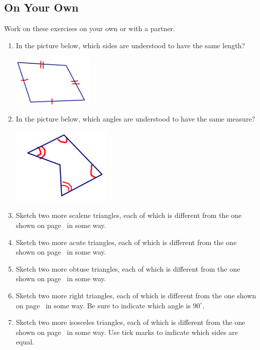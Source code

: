 \subsection*{On Your Own}
Work on these exercises on your own or with a partner.  
\begin{enumerate}
\item
In the picture below, which sides are understood to have the same length?
\begin{center}
\includegraphics[height=2.5cm]{whatseq}  
\end{center}

\item
In the picture below, which angles are understood to have the same measure?
\begin{center}
\includegraphics[height=3.7cm]{whatseq2}  
\end{center}


\item
Sketch two more scalene triangles, each of which is different from the one shown on page~\pageref{def:trisides} in some way.  \\
\item
Sketch two more acute triangles, each of which is different from the one shown on page~\pageref{def:triangs} in some way.\\
\item
Sketch two more obtuse triangles, each of which is different from the one shown on page~\pageref{def:triangs} in some way.\\
\item
Sketch two more right triangles, each of which is different from the one shown on page~\pageref{def:triangs} in some way.  Be sure to indicate which angle is $90^\circ$.\\
\item
Sketch two more isosceles triangles, each of which is different from the one shown on page~\pageref{def:trisides} in some way.  Use tick marks to indicate which sides are equal.
\end{enumerate}



